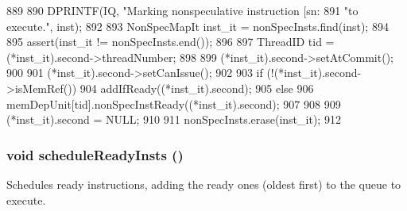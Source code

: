 \begin{DoxyCode}
889 {
890     DPRINTF(IQ, "Marking nonspeculative instruction [sn:%
891             "to execute.\n", inst);
892 
893     NonSpecMapIt inst_it = nonSpecInsts.find(inst);
894 
895     assert(inst_it != nonSpecInsts.end());
896 
897     ThreadID tid = (*inst_it).second->threadNumber;
898 
899     (*inst_it).second->setAtCommit();
900 
901     (*inst_it).second->setCanIssue();
902 
903     if (!(*inst_it).second->isMemRef()) {
904         addIfReady((*inst_it).second);
905     } else {
906         memDepUnit[tid].nonSpecInstReady((*inst_it).second);
907     }
908 
909     (*inst_it).second = NULL;
910 
911     nonSpecInsts.erase(inst_it);
912 }
\end{DoxyCode}
\hypertarget{classInstructionQueue_a3694e72427d3a616808797f9343d1fc4}{
\subsubsection[{scheduleReadyInsts}]{\setlength{\rightskip}{0pt plus 5cm}void scheduleReadyInsts ()}}
\label{classInstructionQueue_a3694e72427d3a616808797f9343d1fc4}
Schedules ready instructions, adding the ready ones (oldest first) to the queue to execute. 


